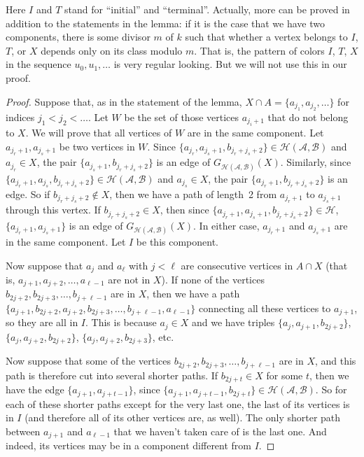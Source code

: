 \documentclass[11pt,a4paper]{article}
\begin{document}
Here $I$ and $T$ stand for ``initial'' and ``terminal''. Actually, more can be proved in addition to the statements in the lemma: if it is the case that we have two components, there is some divisor $m$ of $k$ such that whether a vertex belongs to $I$, $T$, or $X$ depends only on its class modulo $m$. That is, the pattern of colors $I$, $T$, $X$ in the sequence $u_0,u_1,\dots$ is very regular looking. But we will not use this in our proof.

\begin{proof}
 Suppose that, as in the statement of the lemma, $X\cap A=\{a_{j_1},a_{j_2},\dots\}$ for indices $j_1<j_2<\dots$. Let $W$ be the set of those vertices $a_{j_i +1}$ that do not belong to $X$. We will prove that all vertices of $W$ are in the same component. Let $a_{j_r +1},a_{j_s +1}$ be two vertices in $W$. Since $\{a_{j_r},a_{j_s +1},b_{j_r + j_s +2}\}\in \mathcal{H(A,B)}$ and $a_{j_r}\in X$, the pair $\{a_{j_s +1},b_{j_r +j_s +2}\}$ is an edge of $G_{\mathcal{H(A,B)}}(X)$. Similarly, since $\{a_{j_r +1},a_{j_s},b_{j_r + j_s +2}\}\in \mathcal{H(A,B)}$ and $a_{j_s}\in X$, the pair $\{a_{j_r +1},b_{j_r +j_s +2}\}$ is an edge. So if $b_{j_r +j_s +2}\not\in X$, then we have a path of length~2 from $a_{j_r +1}$ to $a_{j_s+1}$ through this vertex. If $b_{j_r +j_s +2}\in X$, then since $\{a_{j_r +1}, a_{j_s +1},b_{j_r +j_s +2}\}\in \mathcal{H}$, $\{a_{j_r +1},a_{j_s +1}\}$ is an edge of $G_{\mathcal{H(A,B)}}(X)$. In either case, $a_{j_r +1}$ and $a_{j_s +1}$ are in the same component. Let $I$ be this component.

Now suppose that $a_j$ and $a_{\ell}$ with $j<\ell$ are consecutive vertices in $A\cap X$ (that is, $a_{j+1},a_{j+2},\dots, a_{\ell -1}$ are not in $X$). %
If none of the vertices $b_{2j+2},b_{2j+3},\dots,b_{j+\ell -1}$ are in $X$, then we have a path $\{ a_{j+1},b_{2j+2},a_{j+2},\allowbreak b_{2j+3},\dots,b_{j+\ell -1},a_{\ell -1} \}$ connecting all these vertices to $a_{j+1}$, so they are all in $I$. This is because $a_j\in X$ and we have triples $\{a_j, a_{j+1},b_{2j+2}\}$, $\{a_j,a_{j+2},b_{2j+2}\}$, $\{a_j,a_{j+2},b_{2j+3}\}$, etc.

Now suppose that some of the vertices $b_{2j+2},b_{2j+3},\dots,b_{j+\ell -1}$ are in $X$, and this path is therefore cut into several shorter paths. If $b_{2j+t}\in X$ for some $t$, then we have the edge $\{a_{j+1},a_{j+t-1}\}$, since $\{a_{j+1},a_{j+t-1},b_{2j+t}\}\in \mathcal{H(A,B)}$. So for each of these shorter paths except for the very last one, the last of its vertices is in $I$ (and therefore all of its other vertices are, as well). The only shorter path between $a_{j+1}$ and $a_{\ell -1}$ that we haven't taken care of is the last one. And indeed, its vertices may be in a component different from $I$.


\end{proof}
\end{document}
